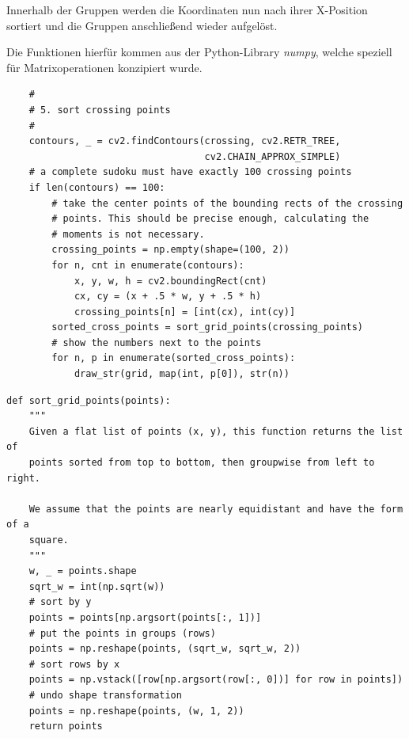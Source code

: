 Innerhalb der Gruppen werden die Koordinaten nun nach ihrer X-Position sortiert und die Gruppen anschließend wieder aufgelöst.

Die Funktionen hierfür kommen aus der Python-Library \emph{numpy}, welche speziell für Matrixoperationen konzipiert wurde.

\begin{lstlisting}
    #
    # 5. sort crossing points
    #
    contours, _ = cv2.findContours(crossing, cv2.RETR_TREE,
                                   cv2.CHAIN_APPROX_SIMPLE)
    # a complete sudoku must have exactly 100 crossing points
    if len(contours) == 100:
        # take the center points of the bounding rects of the crossing
        # points. This should be precise enough, calculating the
        # moments is not necessary.
        crossing_points = np.empty(shape=(100, 2))
        for n, cnt in enumerate(contours):
            x, y, w, h = cv2.boundingRect(cnt)
            cx, cy = (x + .5 * w, y + .5 * h)
            crossing_points[n] = [int(cx), int(cy)]
        sorted_cross_points = sort_grid_points(crossing_points)
        # show the numbers next to the points
        for n, p in enumerate(sorted_cross_points):
            draw_str(grid, map(int, p[0]), str(n))
\end{lstlisting}

\begin{lstlisting}
def sort_grid_points(points):
    """
    Given a flat list of points (x, y), this function returns the list of
    points sorted from top to bottom, then groupwise from left to right.

    We assume that the points are nearly equidistant and have the form of a
    square.
    """
    w, _ = points.shape
    sqrt_w = int(np.sqrt(w))
    # sort by y
    points = points[np.argsort(points[:, 1])]
    # put the points in groups (rows)
    points = np.reshape(points, (sqrt_w, sqrt_w, 2))
    # sort rows by x
    points = np.vstack([row[np.argsort(row[:, 0])] for row in points])
    # undo shape transformation
    points = np.reshape(points, (w, 1, 2))
    return points
\end{lstlisting}

